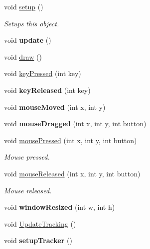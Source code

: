 \begin{DoxyCompactItemize}
\item 
void \hyperlink{classtest_app_ad431db15b6150b965cd52bcba8e16e11}{setup} ()
\begin{DoxyCompactList}\small\item\em Setups this object. \end{DoxyCompactList}\item 
\hypertarget{classtest_app_afb39d201aec71a295b7609876bf7d0c6}{void {\bfseries update} ()}\label{classtest_app_afb39d201aec71a295b7609876bf7d0c6}

\item 
void \hyperlink{classtest_app_af869cba67b1dab8481f8d0e216d59dcd}{draw} ()
\item 
void \hyperlink{classtest_app_a904d147c7e532cb92656d5dd4895cd26}{key\-Pressed} (int key)
\item 
\hypertarget{classtest_app_a1116a10088e4932f6d482efe723cd45e}{void {\bfseries key\-Released} (int key)}\label{classtest_app_a1116a10088e4932f6d482efe723cd45e}

\item 
\hypertarget{classtest_app_a33541b19eff9f8285b2487bfc146d58b}{void {\bfseries mouse\-Moved} (int x, int y)}\label{classtest_app_a33541b19eff9f8285b2487bfc146d58b}

\item 
\hypertarget{classtest_app_a075bcc2be16fd8f3eaa9162fb40a0a1f}{void {\bfseries mouse\-Dragged} (int x, int y, int button)}\label{classtest_app_a075bcc2be16fd8f3eaa9162fb40a0a1f}

\item 
void \hyperlink{classtest_app_a3f200702ce91859cac2872a39302679d}{mouse\-Pressed} (int x, int y, int button)
\begin{DoxyCompactList}\small\item\em Mouse pressed. \end{DoxyCompactList}\item 
void \hyperlink{classtest_app_aa3680ffc782b1e5c451289817f20c9c6}{mouse\-Released} (int x, int y, int button)
\begin{DoxyCompactList}\small\item\em Mouse released. \end{DoxyCompactList}\item 
\hypertarget{classtest_app_a428b7df9c64352d6e7cb234fc297e6c9}{void {\bfseries window\-Resized} (int w, int h)}\label{classtest_app_a428b7df9c64352d6e7cb234fc297e6c9}

\item 
void \hyperlink{classtest_app_a853bbabdab3e7d2f207bb5a2028990bd}{Update\-Tracking} ()
\item 
\hypertarget{classtest_app_a6a4db7a6a914fc4899763fc94bfca4b7}{void {\bfseries setup\-Tracker} ()}\label{classtest_app_a6a4db7a6a914fc4899763fc94bfca4b7}


\end{DoxyCompactItemize}
